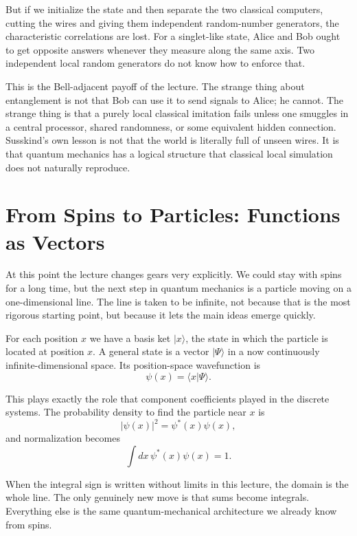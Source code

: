 But if we initialize the state and then separate the two classical computers, cutting the wires and giving them independent random-number generators, the characteristic correlations are lost. For a singlet-like state, Alice and Bob ought to get opposite answers whenever they measure along the same axis. Two independent local random generators do not know how to enforce that.

This is the Bell-adjacent payoff of the lecture. The strange thing about entanglement is not that Bob can use it to send signals to Alice; he cannot. The strange thing is that a purely local classical imitation fails unless one smuggles in a central processor, shared randomness, or some equivalent hidden connection. Susskind's own lesson is not that the world is literally full of unseen wires. It is that quantum mechanics has a logical structure that classical local simulation does not naturally reproduce.

\section{From Spins to Particles: Functions as Vectors}

At this point the lecture changes gears very explicitly. We could stay with spins for a long time, but the next step in quantum mechanics is a particle moving on a one-dimensional line. The line is taken to be infinite, not because that is the most rigorous starting point, but because it lets the main ideas emerge quickly.

For each position \(x\) we have a basis ket \(|x\rangle\), the state in which the particle is located at position \(x\). A general state is a vector \(|\Psi\rangle\) in a now continuously infinite-dimensional space. Its position-space wavefunction is
\begin{equation}
\psi(x)=\langle x|\Psi\rangle.
\end{equation}

This plays exactly the role that component coefficients played in the discrete systems. The probability density to find the particle near \(x\) is
\begin{equation}
|\psi(x)|^2=\psi^*(x)\psi(x),
\end{equation}
and normalization becomes
\begin{equation}
\int dx\,\psi^*(x)\psi(x)=1.
\end{equation}

When the integral sign is written without limits in this lecture, the domain is the whole line. The only genuinely new move is that sums become integrals. Everything else is the same quantum-mechanical architecture we already know from spins.

